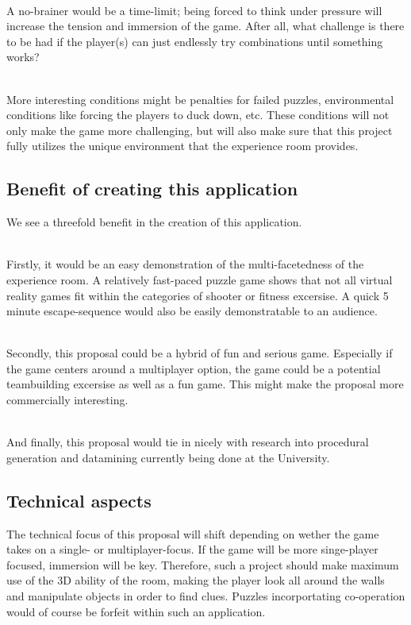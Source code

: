 \documentclass[11pt]{article}
\begin{document}
~\\
A no-brainer would be a time-limit; being forced to think under pressure will increase the tension and immersion of the game. After all, what challenge is there to be had if the player(s) can just endlessly try combinations until something works?

~\\
\newpage
More interesting conditions might be penalties for failed puzzles, environmental conditions like forcing the players to duck down, etc. These conditions will not only make the game more challenging, but will also make sure that this project fully utilizes the unique environment that the experience room provides.


\newpage
{}
\subsection*{Benefit of creating this application}
We see a threefold benefit in the creation of this application. 

~\\
Firstly, it would be an easy demonstration of the multi-facetedness of the experience room. A relatively fast-paced puzzle game shows that not all virtual reality games fit within the categories of shooter or fitness excersise. A quick 5 minute escape-sequence would also be easily demonstratable to an audience.

~\\
Secondly, this proposal could be a hybrid of fun and serious game. Especially if the game centers around a multiplayer option, the game could be a potential teambuilding excersise as well as a fun game. This might make the proposal more commercially interesting.

~\\
And finally, this proposal would tie in nicely with research into procedural generation and datamining currently being done at the University. 


\subsection*{Technical aspects}
The technical focus of this proposal will shift depending on wether the game takes on a single- or multiplayer-focus. If the game will be more singe-player focused, immersion will be key. Therefore, such a project should make maximum use of the 3D ability of the room, making the player look all around the walls and manipulate objects in order to find clues. Puzzles incorportating co-operation would of course be forfeit within such an application. 
\end{document}
